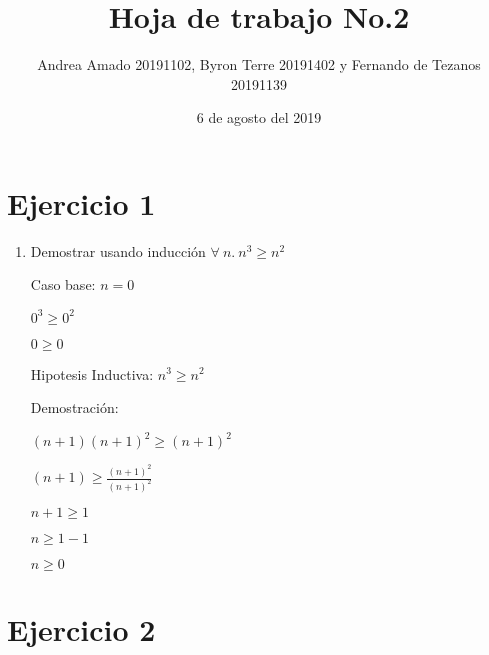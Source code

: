 \documentclass{article}
\author{Andrea Amado 20191102, Byron Terre 20191402  y Fernando de Tezanos 20191139}
\title{Hoja de trabajo No.2}
\date{6 de agosto del 2019}
\begin{document}
\maketitle



\section{Ejercicio 1}

\begin{enumerate}

    \item Demostrar usando inducción  $\forall\ n.\ n^3\geq n^2$ \par

    Caso base: $n=0$ \par

    $ 0^3\geq 0^2$ \par

    $0\geq 0$ \par

    Hipotesis Inductiva: $ n^3\geq n^2\ $ \par

    Demostración: \par

    $(n+1)(n+1)^2 \geq (n+1)^2$ \par

    $(n+1)\geq \frac{(n+1)^2}{(n+1)^2}$ \par

    $n+1\geq 1$ \par

    $n\geq 1-1$ \par

    $n\geq 0$

\end{enumerate}



\section{Ejercicio 2}
\end{document}
